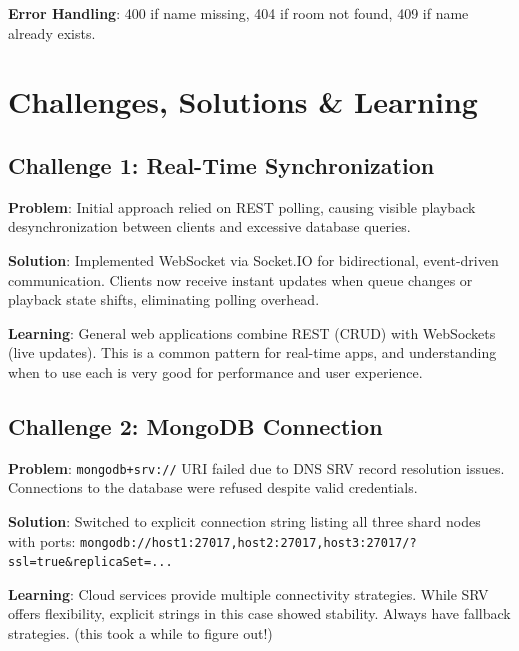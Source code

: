 \documentclass[11pt,a4paper]{article}
\begin{document}
\textbf{Error Handling}: 400 if name missing, 404 if room not found, 409 if name already exists.

\section{Challenges, Solutions \& Learning}

\subsection{Challenge 1: Real-Time Synchronization}

\textbf{Problem}: Initial approach relied on REST polling, causing visible playback desynchronization between clients and excessive database queries.

\textbf{Solution}: Implemented WebSocket via Socket.IO for bidirectional, event-driven communication. Clients now receive instant updates when queue changes or playback state shifts, eliminating polling overhead.

\textbf{Learning}: General web applications combine REST (CRUD) with WebSockets (live updates). This is a common pattern for real-time apps, and understanding when to use each is very good for performance and user experience.

\subsection{Challenge 2: MongoDB Connection}

\textbf{Problem}: \texttt{mongodb+srv://} URI failed due to DNS SRV record resolution issues. Connections to the database were refused despite valid credentials.

\textbf{Solution}: Switched to explicit connection string listing all three shard nodes with ports: \texttt{mongodb://host1:27017,host2:27017,host3:27017/?ssl=true\&replicaSet=...}

\textbf{Learning}: Cloud services provide multiple connectivity strategies. While SRV offers flexibility, explicit strings in this case showed stability. Always have fallback strategies. (this took a while to figure out!)

\end{document}
